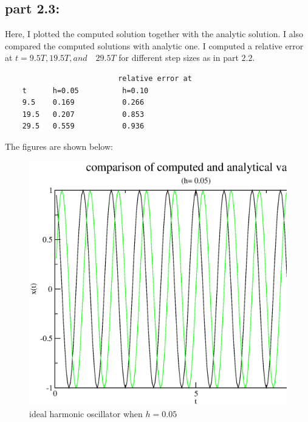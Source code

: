 \documentclass[11pt,a4paper,english]{article}
\begin{document}
    \subsection{part 2.3: }
	Here, I plotted the computed solution together with the analytic solution.
	I also compared the computed solutions with analytic one.
	I computed a relative error at $t = 9.5T, 19.5T, and \quad 29.5T$ for different step
	sizes as in part $2.2$.
    \begin{verbatim}
                          relative error at
    t      h=0.05          h=0.10
    9.5    0.169           0.266
    19.5   0.207           0.853
    29.5   0.559           0.936
    \end{verbatim}	
    		    The figures are shown below:\\
	\begin{figure}[h!]
	\centering
	\includegraphics [scale=0.6]{figures/compare05.eps}
	\caption{ideal harmonic oscillator when $ h=0.05$ }
	\end{figure}
\end{document}
